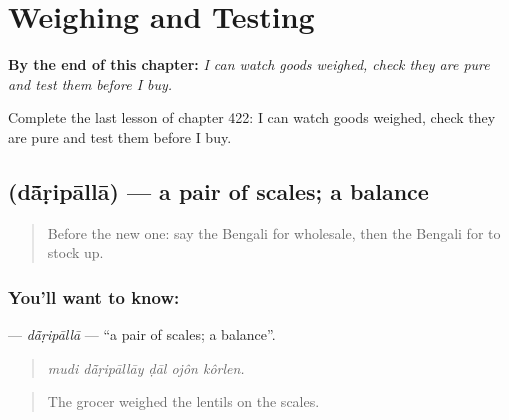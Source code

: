 
\chapter{Weighing and Testing}
\label{ch:bn-weighing-and-testing}

\begin{chapteropening}
\textbf{By the end of this chapter:} \emph{I can watch goods weighed, check they are pure and test them before I buy.}

Complete the last lesson of chapter 422: I can watch goods weighed, check they are pure and test them before I buy.
\end{chapteropening}

\section[\texorpdfstring{\bn{দাঁড়িপাল্লা} (dā̃ṛipāllā)}{দাঁড়িপাল্লা (dā̃ṛipāllā)}]{ (dā̃ṛipāllā) — a pair of scales; a balance}

\label{lesson:BN-C422-daripalla}



\begin{quote}
Before the new one: say the Bengali for wholesale, then the Bengali for to stock up.
\end{quote}

\subsection*{You'll want to know: }
\textbf{} — \emph{dā̃ṛipāllā} — \textquotedblleft{}a pair of scales; a balance\textquotedblright{}.

\begin{quote}
    
\end{quote}

\begin{quote}
\emph{mudi dā̃ṛipāllāy ḍāl ojôn kôrlen.}
\end{quote}

\begin{quote}
The grocer weighed the lentils on the scales.
\end{quote}


